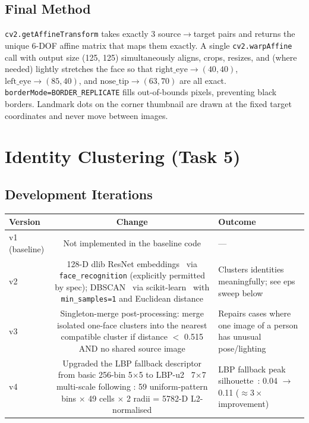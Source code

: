 \documentclass[11pt,a4paper,titlepage]{article}
\begin{document}
\subsection{Final Method}
\texttt{cv2.getAffineTransform} takes exactly 3 source$\rightarrow$target pairs
and returns the unique 6-DOF affine matrix that maps them exactly. A single
\texttt{cv2.warpAffine} call with output size (125, 125) simultaneously aligns,
crops, resizes, and (where needed) lightly stretches the face so that
$\text{right\_eye} \to (40, 40)$, $\text{left\_eye} \to (85, 40)$, and
$\text{nose\_tip} \to (63, 70)$ are all exact. \texttt{borderMode=BORDER\_REPLICATE}
fills out-of-bounds pixels, preventing black borders. Landmark dots on the
corner thumbnail are drawn at the fixed target coordinates and never move
between images.

\section{Identity Clustering (Task 5)}

\subsection{Development Iterations}
\noindent
\begin{tabularx}{\linewidth}{@{}V C O@{}}
\toprule
\textbf{Version} & \textbf{Change} & \textbf{Outcome} \\
\midrule
v1 (baseline) & Not implemented in the baseline code & --- \\
v2 & 128-D dlib ResNet embeddings~\citep{king2009dlib} via \texttt{face\_recognition}
     (explicitly permitted by spec); DBSCAN~\citep{ester1996density} via
     scikit-learn~\citep{pedregosa2011scikit} with \texttt{min\_samples=1} and
     Euclidean distance
   & Clusters identities meaningfully; see eps sweep below \\
v3 & Singleton-merge post-processing: merge isolated one-face clusters into
     the nearest compatible cluster if distance $<$ 0.515 AND no shared
     source image
   & Repairs cases where one image of a person has unusual pose/lighting \\
v4 & Upgraded the LBP fallback descriptor from basic 256-bin 5$\times$5 to
     LBP-u2~\citep{ojala2002multiresolution} 7$\times$7 multi-scale
     following \citet{ahonen2006face}: 59 uniform-pattern bins
     $\times$ 49 cells $\times$ 2 radii = 5782-D L2-normalised
   & LBP fallback peak silhouette~\citep{rousseeuw1987silhouettes}:
     0.04 $\to$ 0.11 ($\approx 3\times$ improvement) \\
\bottomrule
\end{tabularx}
\end{document}
